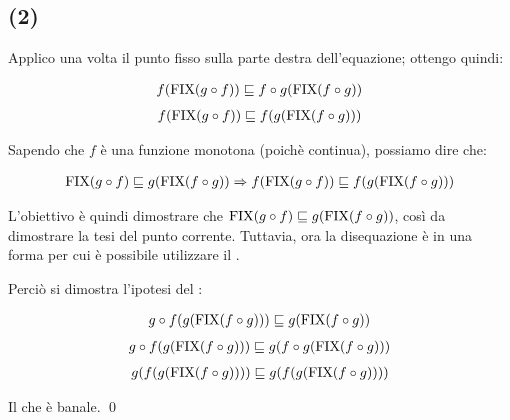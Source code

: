 \subsection{(2)}

Applico una volta il punto fisso sulla parte destra dell'equazione; ottengo
quindi:

\begin{align*}
f(\textrm{\normalfont{FIX}}(g \circ f)) \sqsubseteq f \circ g(\textrm{\normalfont{FIX}}(f \circ g))
\end{align*}
\begin{align*}
f(\textrm{\normalfont{FIX}}(g \circ f)) \sqsubseteq f(g(\textrm{\normalfont{FIX}}(f \circ g)))
\end{align*}

Sapendo che $f$ è una funzione monotona (poichè continua), possiamo dire che:

\begin{align*}
\textrm{\normalfont{FIX}}(g \circ f) \sqsubseteq g(\textrm{\normalfont{FIX}}(f \circ g))
\Rightarrow
f(\textrm{\normalfont{FIX}}(g \circ f)) \sqsubseteq f(g(\textrm{\normalfont{FIX}}(f \circ g)))
\end{align*}

L'obiettivo è quindi dimostrare che $\textrm{\normalfont{FIX}}(g \circ f) \sqsubseteq g(\textrm{\normalfont{FIX}}(f \circ g))$,
così da dimostrare la tesi del punto corrente. Tuttavia, ora la disequazione è
in una forma per cui è possibile utilizzare il \FPIL.

Perciò si dimostra l'ipotesi del \FPIL:

\begin{align*}
g \circ f(g(\textrm{\normalfont{FIX}}(f \circ g))) \sqsubseteq g(\textrm{\normalfont{FIX}}(f \circ g))
\end{align*}
\begin{align*}
g \circ f(g(\textrm{\normalfont{FIX}}(f \circ g))) \sqsubseteq g(f \circ g(\textrm{\normalfont{FIX}}(f \circ g)))
\end{align*}
\begin{align*}
g(f(g(\textrm{\normalfont{FIX}}(f \circ g)))) \sqsubseteq g(f(g(\textrm{\normalfont{FIX}}(f \circ g))))
\end{align*}

Il che è banale. \qed

\undef{\lt}

